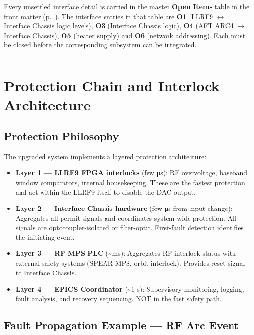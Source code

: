 Every unsettled interface detail is carried in the master \hyperref[open-items]{\textbf{Open Items}} table in the front matter (p.~\pageref{open-items}). The interface entries in that table are \textbf{O1} (LLRF9 $\leftrightarrow$ Interface Chassis logic levels), \textbf{O3} (Interface Chassis logic), \textbf{O4} (AFT ARC4 $\rightarrow$ Interface Chassis), \textbf{O5} (heater supply) and \textbf{O6} (network addressing). Each must be closed before the corresponding subsystem can be integrated.

\begin{center}\rule{0.5\linewidth}{0.5pt}\end{center}

\section{Protection Chain and Interlock Architecture}\label{protection-chain-and-interlock-architecture}

\subsection{Protection Philosophy}\label{protection-philosophy}

The upgraded system implements a layered protection architecture:

\begin{itemize}
\tightlist
\item
  \textbf{Layer 1 --- LLRF9 FPGA interlocks} (few μs): RF overvoltage, baseband window comparators, internal housekeeping. These are the fastest protection and act within the LLRF9 itself to disable the DAC output.
\item
  \textbf{Layer 2 --- Interface Chassis hardware} (few μs from input change): Aggregates all permit signals and coordinates system-wide protection. All signals are optocoupler-isolated or fiber-optic. First-fault detection identifies the initiating event.
\item
  \textbf{Layer 3 --- RF MPS PLC} (\textasciitilde ms): Aggregates RF interlock status with external safety systems (SPEAR MPS, orbit interlock). Provides reset signal to Interface Chassis.
\item
  \textbf{Layer 4 --- EPICS Coordinator} (\textasciitilde1 s): Supervisory monitoring, logging, fault analysis, and recovery sequencing. NOT in the fast safety path.
\end{itemize}

\subsection{Fault Propagation Example --- RF Arc Event}\label{fault-propagation-example-rf-arc-event}

